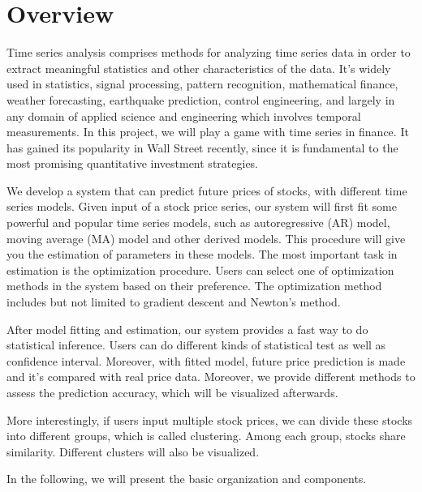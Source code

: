 

\section{Overview}

Time series analysis comprises methods for analyzing time series data in order to extract meaningful statistics and other characteristics of the data. It's widely used in statistics, signal processing, pattern recognition, mathematical finance, weather forecasting, earthquake prediction, control engineering, and largely in any domain of applied science and engineering which involves temporal measurements. In this project, we will play a game with time series in finance. It has gained its popularity in Wall Street recently, since it is fundamental to the most promising quantitative investment strategies. 

We develop a system that can predict future prices of stocks, with different time series models. Given input of a stock price series, our system will first fit some powerful and popular time series models, such as autoregressive (AR) model, moving average (MA) model and other derived models. This procedure will give you the estimation of parameters in these models. The most important task in estimation is the optimization procedure. Users can select one of optimization methods in the system based on their preference. The optimization method includes but not limited to gradient descent and Newton's method.

After model fitting and estimation, our system provides a fast way to do statistical inference. Users can do different kinds of statistical test as well as confidence interval. Moreover, with fitted model, future price prediction is made and it's compared with real price data. Moreover, we provide different methods to assess the prediction accuracy, which will be visualized afterwards.

More interestingly, if users input multiple stock prices, we can divide these stocks into different groups, which is called clustering. Among each group, stocks share similarity. Different clusters will also be visualized.

In the following, we will present the basic organization and components.

